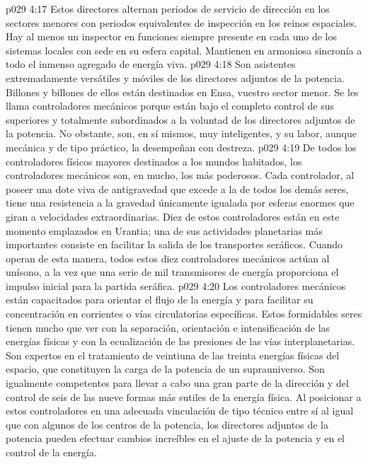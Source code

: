 \vs p029 4:17 Estos directores alternan periodos de servicio de dirección en los sectores menores con periodos equivalentes de inspección en los reinos espaciales. Hay al menos un inspector en funciones siempre presente en cada uno de los sistemas locales con sede en su esfera capital. Mantienen en armoniosa sincronía a todo el inmenso agregado de energía viva.
\vs p029 4:18  Son asistentes extremadamente versátiles y móviles de los directores adjuntos de la potencia. Billones y billones de ellos están destinados en Ensa, vuestro sector menor. Se les llama controladores mecánicos porque están bajo el completo control de sus superiores y totalmente subordinados a la voluntad de los directores adjuntos de la potencia. No obstante, son, en sí mismos, muy inteligentes, y su labor, aunque mecánica y de tipo práctico, la desempeñan con destreza.
\vs p029 4:19 De todos los controladores físicos mayores destinados a los mundos habitados, los controladores mecánicos son, en mucho, los más poderosos. Cada controlador, al poseer una dote viva de antigravedad que excede a la de todos los demás seres, tiene una resistencia a la gravedad únicamente igualada por esferas enormes que giran a velocidades extraordinarias. Diez de estos controladores están en este momento emplazados en Urantia; una de sus actividades planetarias más importantes consiste en facilitar la salida de los transportes seráficos. Cuando operan de esta manera, todos estos diez controladores mecánicos actúan al unísono, a la vez que una serie de mil transmisores de energía proporciona el impulso inicial para la partida seráfica.
\vs p029 4:20 Los controladores mecánicos están capacitados para orientar el flujo de la energía y para facilitar su concentración en corrientes o vías circulatorias específicas. Estos formidables seres tienen mucho que ver con la separación, orientación e intensificación de las energías físicas y con la ecualización de las presiones de las vías interplanetarias. Son expertos en el tratamiento de veintiuna de las treinta energías físicas del espacio, que constituyen la carga de la potencia de un suprauniverso. Son igualmente competentes para llevar a cabo una gran parte de la dirección y del control de seis de las nueve formas más sutiles de la energía física. Al posicionar a estos controladores en una adecuada vinculación de tipo técnico entre sí al igual que con algunos de los centros de la potencia, los directores adjuntos de la potencia pueden efectuar cambios increíbles en el ajuste de la potencia y en el control de la energía.
